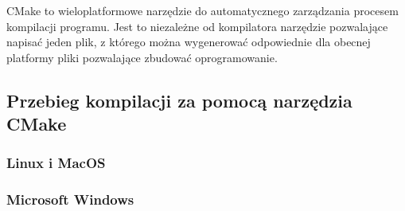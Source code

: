 CMake to wieloplatformowe narzędzie do automatycznego zarządzania procesem kompilacji programu.
Jest to niezależne od kompilatora narzędzie pozwalające napisać jeden plik, z którego można wygenerować odpowiednie dla obecnej platformy pliki pozwalające zbudować oprogramowanie.

\subsection{Przebieg kompilacji za pomocą narzędzia CMake}

\subsubsection{Linux i MacOS}

\subsubsection{Microsoft Windows}